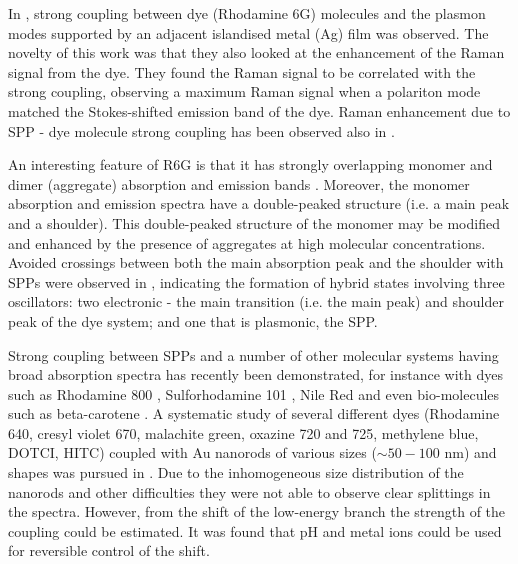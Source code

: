 \documentclass[12pt]{iopart}
\begin{document}
In \cite{Cade2009}, strong coupling between dye (Rhodamine 6G) molecules and the plasmon modes supported by an adjacent islandised metal (Ag) film was observed. The novelty of this work was that they also looked at the enhancement of the Raman signal from the dye. They found the Raman signal to be correlated with the strong coupling, observing a maximum Raman signal when a polariton mode matched the Stokes-shifted emission band of the dye. Raman enhancement due to SPP - dye molecule strong coupling has been observed also in \cite{Nagasawa2014}.

An interesting feature of R6G is that it has strongly overlapping monomer and dimer (aggregate) absorption and emission bands \cite{Kuznetsov1973,Levshin1977}. Moreover, the monomer absorption and emission spectra have a double-peaked structure (i.e. a main peak and a shoulder). This double-peaked structure of the monomer may be modified and enhanced by the presence of aggregates at high molecular concentrations. Avoided crossings between both the main absorption peak and the shoulder with SPPs were observed in \cite{Hakala2009}, indicating the formation of hybrid states involving three oscillators: two electronic - the main transition (i.e. the main peak) and shoulder peak of the dye system; and one that is plasmonic, the SPP. 

Strong coupling between SPPs and a number of other molecular systems having broad absorption spectra has recently been demonstrated, for instance with dyes such as Rhodamine 800 \cite{Valmorra2011}, Sulforhodamine 101 \cite{Baieva2012}, Nile Red \cite{Koponen2013} and even bio-molecules such as beta-carotene \cite{Baieva2013}. A systematic study of several different dyes (Rhodamine 640, cresyl violet 670, malachite green, oxazine 720 and 725, methylene blue, DOTCI, HITC) coupled with Au nanorods of various sizes ($\sim 50-100$ nm) and shapes was pursued in \cite{Ni2010}. Due to the inhomogeneous size distribution of the nanorods and other difficulties they were not able to observe clear splittings in the spectra. However, from the shift of the low-energy branch the strength of the coupling could be estimated. It was found that pH and metal ions could be used for reversible control of the shift.       
\end{document}
